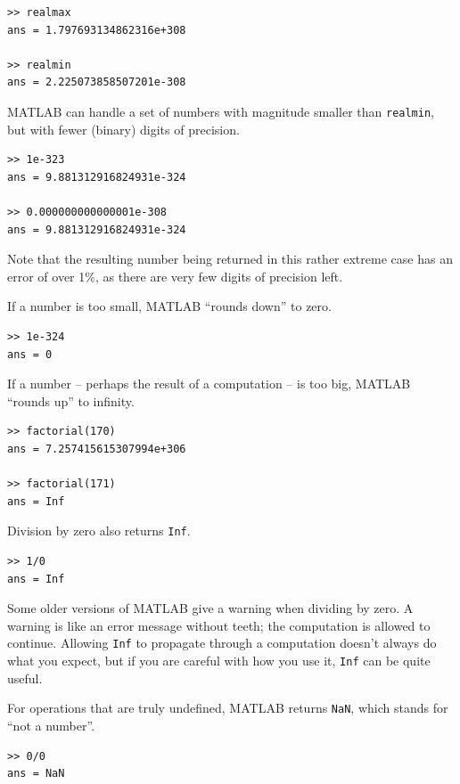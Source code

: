 \documentclass[
]{book}
\begin{document}
\begin{verbatim}
>> realmax
ans = 1.797693134862316e+308

>> realmin
ans = 2.225073858507201e-308
\end{verbatim}

MATLAB can handle a set of numbers with magnitude smaller than 
{\tt realmin}, but with fewer (binary) digits of precision.

\begin{verbatim}
>> 1e-323
ans = 9.881312916824931e-324

>> 0.000000000000001e-308
ans = 9.881312916824931e-324
\end{verbatim}

Note that the resulting number being returned in this rather extreme 
case has an error of over 1\%, as there are very few digits of 
precision left.  

If a number is too small, MATLAB ``rounds down'' to zero.

\begin{verbatim}
>> 1e-324
ans = 0
\end{verbatim}

If a number -- perhaps the result of a computation -- is too big, 
MATLAB ``rounds up''
to infinity.

\begin{verbatim}
>> factorial(170)
ans = 7.257415615307994e+306

>> factorial(171)
ans = Inf
\end{verbatim}

Division by zero also returns {\tt Inf}.

\begin{verbatim}
>> 1/0
ans = Inf
\end{verbatim}

Some older versions of MATLAB give a warning when dividing by zero.
A warning is like an error message without teeth; the computation
is allowed to continue.  Allowing {\tt Inf} to propagate
through a computation doesn't always do what you expect, but if you
are careful with how you use it, {\tt Inf} can be quite useful.

For operations that are truly undefined, MATLAB returns {\tt NaN},
which stands for ``not a number''.

\begin{verbatim}
>> 0/0
ans = NaN
\end{verbatim}
\end{document}
